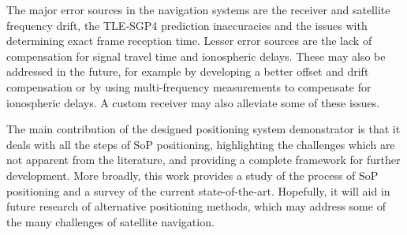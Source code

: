 The major error sources in the navigation systems are the receiver and satellite frequency drift, the TLE-SGP4 prediction inaccuracies and the issues with determining exact frame reception time. Lesser error sources are the lack of compensation for signal travel time and ionospheric delays. These may also be addressed in the future, for example by developing a better offset and drift compensation or by using multi-frequency measurements to compensate for ionospheric delays. A custom receiver may also alleviate some of these issues.

The main contribution of the designed positioning system demonstrator is that it deals with all the steps of SoP positioning, highlighting the challenges which are not apparent from the literature, and providing a complete framework for further development. More broadly, this work provides a study of the process of SoP positioning and a survey of the current state-of-the-art. Hopefully, it will aid in future research of alternative positioning methods, which may address some of the many challenges of satellite navigation.

